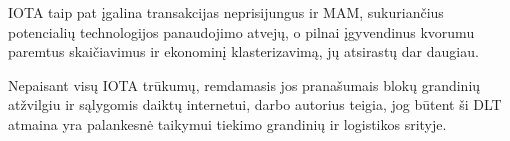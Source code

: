 IOTA taip pat įgalina transakcijas neprisijungus ir MAM, sukuriančius potencialių technologijos panaudojimo atvejų, o pilnai įgyvendinus kvorumu paremtus skaičiavimus ir ekonominį klasterizavimą, jų atsirastų dar daugiau.

Nepaisant visų IOTA trūkumų, remdamasis jos pranašumais blokų grandinių atžvilgiu ir sąlygomis daiktų internetui, darbo autorius teigia, jog būtent ši DLT atmaina yra palankesnė taikymui tiekimo grandinių ir logistikos srityje. 